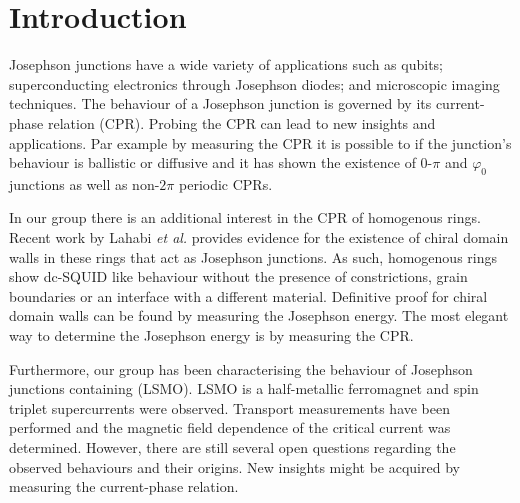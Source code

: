 \chapter{Introduction}
Josephson junctions have a wide variety of applications such as qubits\cite{placeNewMaterialPlatform2021,pechenezhskiySuperconductingQuasichargeQubit2020}; superconducting electronics through Josephson diodes\cite{zhangReconfigurableMagneticfieldfreeSuperconducting2023a,ciacciaGateTunableJosephson2023}; and microscopic imaging techniques\cite{clarkeSQUIDHandbook2004,rogSQUIDontipMagneticMicroscopy2022,pranceSensitivityDCSQUID2023}. The behaviour of a Josephson junction is governed by its current-phase relation (CPR). Probing the CPR can lead to new insights and applications. Par example by measuring the CPR it is possible to if the junction's behaviour is ballistic or diffusive\cite{muraniBallisticEdgeStates2017,endresCurrentPhaseRelation2023,kayyalhaHighlySkewedCurrent2020} and it has shown the existence of $0$-$\pi$ and $\varphi_0$ junctions\cite{frolovMeasurementCurrentPhaseRelation2004,muraniBallisticEdgeStates2017,strambiniJosephsonPhaseBattery2020,szombatiJosephsonPh0junctionNanowire2016} as well as non-$2\pi$ periodic CPRs\cite{endresCurrentPhaseRelation2023}.

In our group there is an additional interest in the CPR of homogenous  rings. Recent work by Lahabi \textit{et al.} provides evidence for the existence of chiral domain walls in these rings that act as Josephson junctions.\cite{lahabiSpintripletSupercurrentsOdd2018} As such, homogenous  rings show dc-SQUID like behaviour without the presence of constrictions, grain boundaries or an interface with a different material. Definitive proof for chiral domain walls can be found by measuring the Josephson energy.\cite{lahabiSpintripletSupercurrentsOdd2018,sigristRoleDomainWalls1999} The most elegant way to determine the Josephson energy is by measuring the CPR.

Furthermore, our group has been characterising the behaviour of Josephson junctions containing  (LSMO). LSMO is a half-metallic ferromagnet and  spin triplet supercurrents were observed. Transport measurements have been performed and the magnetic field dependence of the critical current was determined. However, there are still several open questions regarding the observed behaviours and their origins.\cite{yaoSpinTransportSuperconductivity2023} New insights might be acquired by measuring the current-phase relation.

